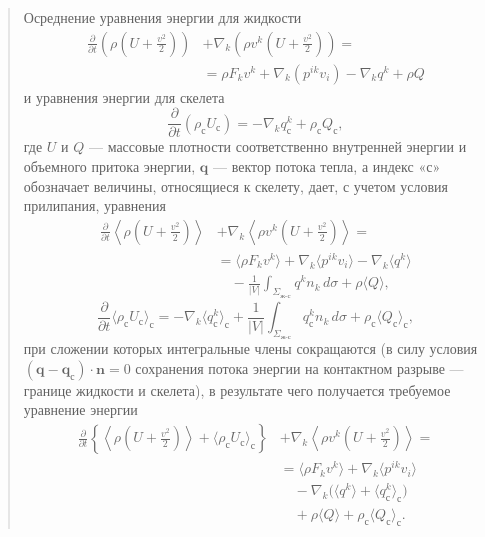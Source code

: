 \documentclass[12pt,a4paper]{article}
\newenvironment{textquote}{\begin{quote}\sloppy}{\end{quote}}
\begin{document}
\begin{textquote}
Осреднение уравнения энергии для жидкости
\[
\begin{aligned}
\frac{\partial}{\partial t}\left(\rho\left(U+\frac{v^2}{2}\right)\right)
&+\nabla_k\left(\rho v^k\left(U+\frac{v^2}{2}\right)\right)=\\
&=\rho F_kv^k+\nabla_k(p^{ik}v_i)-\nabla_kq^k+\rho Q
\end{aligned}
\]
и уравнения энергии для скелета
\[
\frac{\partial}{\partial t}(\rho_{\text{с}}U_{\text{с}})=-\nabla_kq_{\text{с}}^k+\rho_{\text{с}}Q_{\text{с}},
\]
где $U$ и $Q$ --- массовые плотности соответственно внутренней энергии и объемного притока энергии, $\boldsymbol{q}$ --- вектор потока тепла, а индекс «с» обозначает величины, относящиеся к скелету, дает, с учетом условия прилипания, уравнения
\[
\begin{aligned}
\frac{\partial}{\partial t}\left\langle\rho\left(U+\frac{v^2}{2}\right)\right\rangle
&+\nabla_k\left\langle\rho v^k\left(U+\frac{v^2}{2}\right)\right\rangle=\\
&=\langle\rho F_kv^k\rangle+\nabla_k\langle p^{ik}v_i\rangle-\nabla_k\langle q^k\rangle\\
&\quad-\frac{1}{|V|}\int_{\Sigma_{\text{ж-с}}}q^kn_k\,d\sigma+\rho\langle Q\rangle,
\end{aligned}
\]
\[
\frac{\partial}{\partial t}\langle\rho_{\text{с}}U_{\text{с}}\rangle_{\text{с}}
=-\nabla_k\langle q_{\text{с}}^k\rangle_{\text{с}}+\frac{1}{|V|}\int_{\Sigma_{\text{ж-с}}}q_{\text{с}}^kn_k\,d\sigma+\rho_{\text{с}}\langle Q_{\text{с}}\rangle_{\text{с}},
\]
при сложении которых интегральные члены сокращаются (в силу условия $(\boldsymbol{q}-\boldsymbol{q}_{\text{с}})\cdot\boldsymbol{n}=0$ сохранения потока энергии на контактном разрыве --- границе жидкости и скелета), в результате чего получается требуемое уравнение энергии
\begin{equation}
\begin{aligned}
\frac{\partial}{\partial t}\left\{\left\langle\rho\left(U+\frac{v^2}{2}\right)\right\rangle+\langle\rho_{\text{с}}U_{\text{с}}\rangle_{\text{с}}\right\}
&+\nabla_k\left\langle\rho v^k\left(U+\frac{v^2}{2}\right)\right\rangle=\\
&=\langle\rho F_kv^k\rangle+\nabla_k\langle p^{ik}v_i\rangle\\
&\quad-\nabla_k\bigl(\langle q^k\rangle+\langle q_{\text{с}}^k\rangle_{\text{с}}\bigr)\\
&\quad+\rho\langle Q\rangle+\rho_{\text{с}}\langle Q_{\text{с}}\rangle_{\text{с}}.
\end{aligned}
\tag{5.6}\label{q3:eq-5-6}
\end{equation}
\end{textquote}
\end{document}
